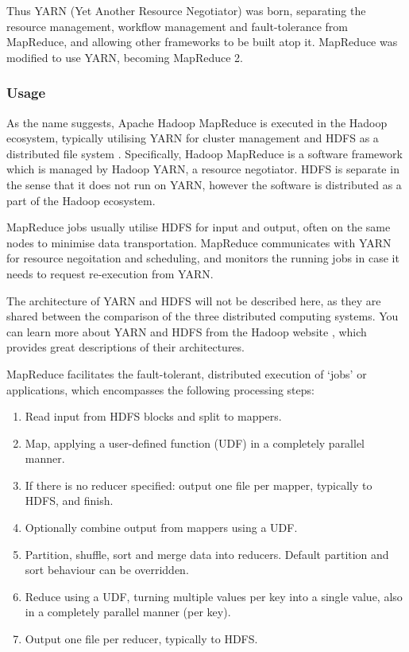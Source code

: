   Thus YARN (Yet Another Resource Negotiator) was born, separating the resource management, workflow management and fault-tolerance from MapReduce, and allowing other frameworks to be built atop it. MapReduce was modified to use YARN, becoming MapReduce 2.


\subsubsection{Usage}

  As the name suggests, Apache Hadoop MapReduce is executed in the Hadoop ecosystem, typically utilising YARN for cluster management \cite{VAVILAPALLI:YARN:2013} and HDFS as a distributed file system \cite{SHVACHKO:HDFS:2010}. Specifically, Hadoop MapReduce is a software framework which is managed by Hadoop YARN, a resource negotiator. HDFS is separate in the sense that it does not run on YARN, however the software is distributed as a part of the Hadoop ecosystem.
  
  MapReduce jobs usually utilise HDFS for input and output, often on the same nodes to minimise data transportation. MapReduce communicates with YARN for resource negoitation and scheduling, and monitors the running jobs in case it needs to request re-execution from YARN.
  
  The architecture of YARN and HDFS will not be described here, as they are shared between the comparison of the three distributed computing systems. You can learn more about YARN and HDFS from the Hadoop website \cite{HADOOP:HOMEPAGE}, which provides great descriptions of their architectures.

  MapReduce facilitates the fault-tolerant, distributed execution of `jobs' or applications, which encompasses the following processing steps:
  
  \begin{enumerate}
    \item Read input from HDFS blocks and split to mappers.
    \item Map, applying a user-defined function (UDF) in a completely parallel manner.
    \item If there is no reducer specified: output one file per mapper, typically to HDFS, and finish.
    \item Optionally combine output from mappers using a UDF.
    \item Partition, shuffle, sort and merge data into reducers. Default partition and sort behaviour can be overridden.
    \item Reduce using a UDF, turning multiple values per key into a single value, also in a completely parallel manner (per key).
    \item Output one file per reducer, typically to HDFS.
  \end{enumerate}
  
